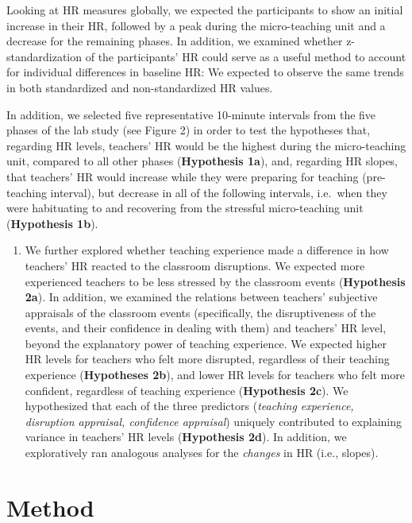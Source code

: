 \documentclass[preprint, 3p,
authoryear]{elsarticle} %
\providecommand{\tightlist}{%
  \setlength{\itemsep}{0pt}\setlength{\parskip}{0pt}}
\begin{document}
Looking at HR measures globally, we expected the participants to show an
initial increase in their HR, followed by a peak during the
micro-teaching unit and a decrease for the remaining phases. In
addition, we examined whether z-standardization of the participants' HR
could serve as a useful method to account for individual differences in
baseline HR: We expected to observe the same trends in both standardized
and non-standardized HR values.

In addition, we selected five representative 10-minute intervals from
the five phases of the lab study (see Figure 2) in order to test the
hypotheses that, regarding HR levels, teachers' HR would be the highest
during the micro-teaching unit, compared to all other phases
(\textbf{Hypothesis 1a}), and, regarding HR slopes, that teachers' HR
would increase while they were preparing for teaching (pre-teaching
interval), but decrease in all of the following intervals, i.e.~when
they were habituating to and recovering from the stressful
micro-teaching unit (\textbf{Hypothesis 1b}).

\begin{enumerate}
\def\labelenumi{(\arabic{enumi})}
\setcounter{enumi}{1}
\tightlist
\item
  We further explored whether teaching experience made a difference in
  how teachers' HR reacted to the classroom disruptions. We expected
  more experienced teachers to be less stressed by the classroom events
  (\textbf{Hypothesis 2a}). In addition, we examined the relations
  between teachers' subjective appraisals of the classroom events
  (specifically, the disruptiveness of the events, and their confidence
  in dealing with them) and teachers' HR level, beyond the explanatory
  power of teaching experience. We expected higher HR levels for
  teachers who felt more disrupted, regardless of their teaching
  experience (\textbf{Hypotheses 2b}), and lower HR levels for teachers
  who felt more confident, regardless of teaching experience
  (\textbf{Hypothesis 2c}). We hypothesized that each of the three
  predictors (\emph{teaching experience, disruption appraisal,
  confidence appraisal}) uniquely contributed to explaining variance in
  teachers' HR levels (\textbf{Hypothesis 2d}). In addition, we
  exploratively ran analogous analyses for the \emph{changes} in HR
  (i.e., slopes).
\end{enumerate}

\section{Method}\label{method}
\end{document}

